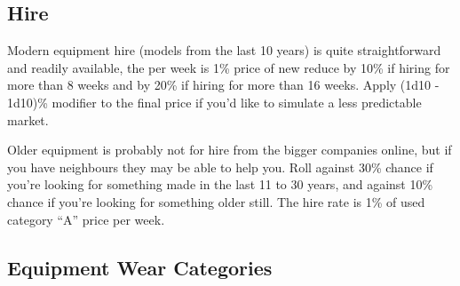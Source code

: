 \documentclass[a4paper,10pt]{article}
\begin{document}
\subsection{Hire}

Modern equipment hire (models from the last 10 years) is quite straightforward
and readily available, the per week is 1\% price of new reduce by 10\% if hiring
for more than 8 weeks and by 20\% if hiring for more than 16 weeks. Apply (1d10
- 1d10)\% modifier to the final price if you'd like to simulate a less
predictable market.

Older equipment is probably not for hire from the bigger companies online, but
if you have neighbours they may be able to help you. Roll against 30\% chance if
you're looking for something made in the last 11 to 30 years, and against 10\%
chance if you're looking for something older still. The hire rate is 1\% of used
category ``A'' price per week.

\subsection{Equipment Wear Categories}
\end{document}
